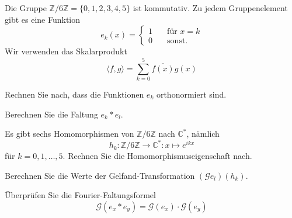 Die Gruppe $\mathbb{Z}/6\mathbb{Z} = \{0,1,2,3,4,5\}$  
ist kommutativ.
Zu jedem Gruppenelement gibt es eine Funktion
\[
e_k(x)
=
\begin{cases}
1&\quad\text{für $x=k$}\\
0&\quad\text{sonst.}
\end{cases}
\]
Wir verwenden das Skalarprodukt
\[
\langle f,g\rangle
=
\sum_{k=0}^5 \overline{f(x)} g(x)
\]

\begin{teilaufgaben}
\item
Rechnen Sie nach, dass die Funktionen $e_k$ orthonormiert sind.
\item
Berechnen Sie die Faltung $e_k*e_l$.
\item
Es gibt sechs Homomorphismen von $\mathbb{Z}/6\mathbb{Z}$ nach $\mathbb{C}^*$,
nämlich
\[
h_k
\colon
\mathbb{Z}/6\mathbb{Z} \to \mathbb{C}^*
:
x\mapsto e^{ikx}
\]
für $k=0,1,\dots,5$.
Rechnen Sie die Homomorphismuseigenschaft nach.
\item
Berechnen Sie die Werte der Gelfand-Transformation
$(\mathscr{G}e_l)(h_k)$.
\item
Überprüfen Sie die Fourier-Faltungsformel
\begin{equation}
\mathscr{G}(e_x*e_y)
=
\mathscr{G}(e_x)\cdot\mathscr{G}(e_y)
\label{buch:gruppen:301:gelfand-produkt}
\end{equation}
\end{teilaufgaben}

